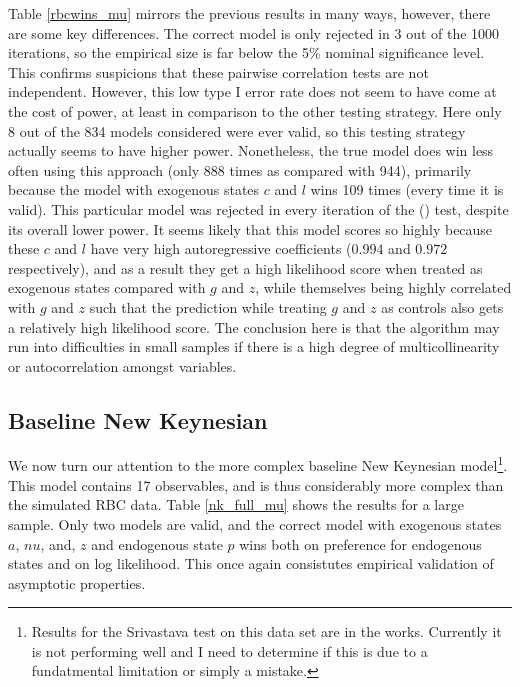\documentclass{article}
\begin{document}
Table \ref{rbcwins_mu} mirrors the previous results in many ways, however, there are some key differences. The correct model is only rejected in 3 out of the 1000 iterations, so the empirical size is far below the 5\% nominal significance level. This confirms suspicions that these pairwise correlation tests are not independent. However, this low type I error rate does not seem to have come at the cost of power, at least in comparison to the other testing strategy. Here only 8 out of the 834 models considered were ever valid, so this testing strategy actually seems to have higher power. Nonetheless, the true model does win less often using this approach (only 888 times as compared with 944), primarily because the model with exogenous states $c$ and $l$ wins 109 times (every time it is valid). This particular model was rejected in every iteration of the \citeauthor{srivastava2005some} (\citeyear{srivastava2005some}) test, despite its overall lower power. It seems likely that this model scores so highly because these $c$ and $l$ have very high autoregressive coefficients ($0.994$ and $0.972$ respectively), and as a result they get a high likelihood score when treated as exogenous states compared with $g$ and $z$, while themselves being highly correlated with $g$ and $z$ such that the prediction while treating $g$ and $z$ as controls also gets a relatively high likelihood score. The conclusion here is that the algorithm may run into difficulties in small samples if there is a high degree of multicollinearity or autocorrelation amongst variables. 

\subsection{Baseline New Keynesian}

We now turn our attention to the more complex baseline New Keynesian model\footnote{Results for the Srivastava test on this data set are in the works. Currently it is not performing well and I need to determine if this is due to a fundatmental limitation or simply a mistake.}. This model contains 17 observables, and is thus considerably more complex than the simulated RBC data. Table \ref{nk_full_mu} shows the results for a large sample. Only two models are valid, and the correct model with exogenous states $a$, $nu$, and, $z$ and endogenous state $p$ wins both on preference for endogenous states and on log likelihood. This once again consistutes empirical validation of asymptotic properties.
\end{document}

